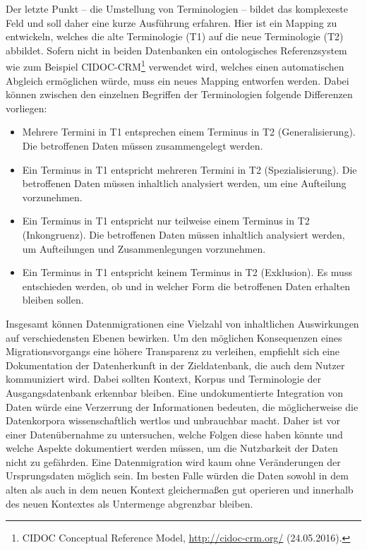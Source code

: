 \documentclass[a4paper,
fontsize=11pt,
oneside,
numbers=noperiodatend,
parskip=half-,
bibliography=totoc,
final
]{scrartcl}
\begin{document}
Der letzte Punkt -- die Umstellung von Terminologien -- bildet das
komplexeste Feld und soll daher eine kurze Ausführung erfahren. Hier ist
ein Mapping zu entwickeln, welches die alte Terminologie (T1) auf die
neue Terminologie (T2) abbildet. Sofern nicht in beiden Datenbanken ein
ontologisches Referenzsystem wie zum Beispiel CIDOC-CRM\footnote{CIDOC
  Conceptual Reference Model, \url{http://cidoc-crm.org/} (24.05.2016).}
verwendet wird, welches einen automatischen Abgleich ermöglichen würde,
muss ein neues Mapping entworfen werden. Dabei können zwischen den
einzelnen Begriffen der Terminologien folgende Differenzen vorliegen:

\begin{itemize}
\item
  Mehrere Termini in T1 entsprechen einem Terminus in T2
  (Generalisierung). Die betroffenen Daten müssen zusammengelegt werden.
\item
  Ein Terminus in T1 entspricht mehreren Termini in T2
  (Spezialisierung). Die betroffenen Daten müssen inhaltlich analysiert
  werden, um eine Aufteilung vorzunehmen.
\item
  Ein Terminus in T1 entspricht nur teilweise einem Terminus in T2
  (Inkongruenz). Die betroffenen Daten müssen inhaltlich analysiert
  werden, um Aufteilungen und Zusammenlegungen vorzunehmen.
\item
  Ein Terminus in T1 entspricht keinem Terminus in T2 (Exklusion). Es
  muss entschieden werden, ob und in welcher Form die betroffenen Daten
  erhalten bleiben sollen.
\end{itemize}

Insgesamt können Datenmigrationen eine Vielzahl von inhaltlichen
Auswirkungen auf verschiedensten Ebenen bewirken. Um den möglichen
Konsequenzen eines Migrationsvorgangs eine höhere Transparenz zu
verleihen, empfiehlt sich eine Dokumentation der Datenherkunft in der
Zieldatenbank, die auch dem Nutzer kommuniziert wird. Dabei sollten
Kontext, Korpus und Terminologie der Ausgangsdatenbank erkennbar
bleiben. Eine undokumentierte Integration von Daten würde eine
Verzerrung der Informationen bedeuten, die möglicherweise die
Datenkorpora wissenschaftlich wertlos und unbrauchbar macht. Daher ist
vor einer Datenübernahme zu untersuchen, welche Folgen diese haben
könnte und welche Aspekte dokumentiert werden müssen, um die Nutzbarkeit
der Daten nicht zu gefährden. Eine Datenmigration wird kaum ohne
Veränderungen der Ursprungsdaten möglich sein. Im besten Falle würden
die Daten sowohl in dem alten als auch in dem neuen Kontext
gleichermaßen gut operieren und innerhalb des neuen Kontextes als
Untermenge abgrenzbar bleiben.
\end{document}
